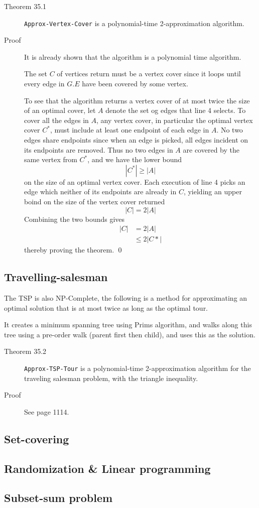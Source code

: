\begin{description}
\item[Theorem 35.1] \texttt{Approx-Vertex-Cover} is a polynomial-time
  2-approximation algorithm.
\item[Proof] It is already shown that the algorithm is a polynomial time
  algorithm.

  The set $C$ of vertices return must be a vertex cover since it loops until
  every edge in $G.E$ have been covered by some vertex.

  To see that the algorithm returns a vertex cover of at most twice the size of
  an optimal cover, let $A$ denote the set og edges that line 4 selects.  To
  cover all the edges in $A$, any vertex cover, in particular the optimal vertex
  cover $C^*$, must include at least one endpoint of each edge in $A$. No two
  edges share endpoints since when an edge is picked, all edges incident on its
  endpoints are removed. Thus no two edges in $A$ are covered by the same vertex
  from $C^*$, and we have the lower bound
  \[
    |C^*| \geq |A|
  \]
  on the size of an optimal vertex cover. Each execution of line 4 picks an edge
  which neither of its endpoints are already in $C$, yielding an upper boind on
  the size of the vertex cover returned
  \[
    |C| = 2|A|
  \]
  Combining the two bounds gives
  \begin{align*}
    |C| &= 2|A| \\
        &\leq 2|C*|
  \end{align*}
  thereby proving the theorem. \qed
\end{description}

\subsection{Travelling-salesman}
The TSP is also NP-Complete, the following is a method for approximating an
optimal solution that is at most twice as long as the optimal tour.

It creates a minimum spanning tree using Prims algorithm, and walks along this
tree using a pre-order walk (parent first then child), and uses this as the
solution.

\begin{description}
\item[Theorem 35.2] \texttt{Approx-TSP-Tour} is a polynomial-time
  2-approximation algorithm for the traveling salesman problem, with the
  triangle inequality.

\item[Proof] See page 1114.
\end{description}

\subsection{Set-covering}
\subsection{Randomization \& Linear programming}
\subsection{Subset-sum problem}